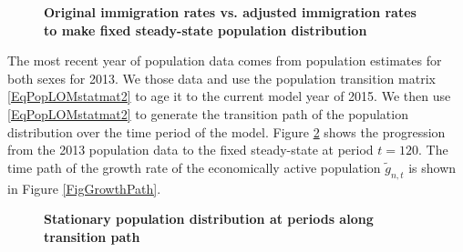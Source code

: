 \documentclass[letterpaper,12pt]{article}
\theoremstyle{definition}
\begin{document}
    \begin{figure}[htbp]\centering \captionsetup{width=4.0in}
      \caption{\label{FigImmRateChg}\textbf{Original immigration rates vs. adjusted immigration rates to make fixed steady-state population distribution}}
    \end{figure}

    The most recent year of population data comes from \citet{Census:2015} population estimates for both sexes for 2013. We those data and use the population transition matrix \eqref{EqPopLOMstatmat2} to age it to the current model year of 2015. We then use \eqref{EqPopLOMstatmat2} to generate the transition path of the population distribution over the time period of the model. Figure \ref{FigPopDistPath} shows the progression from the 2013 population data to the fixed steady-state at period $t=120$. The time path of the growth rate of the economically active population $\tilde{g}_{n,t}$ is shown in Figure \ref{FigGrowthPath}.

    \begin{figure}[htbp]\centering \captionsetup{width=4.0in}
      \caption{\label{FigPopDistPath}\textbf{Stationary population distribution at periods along transition path}}
    \end{figure}
\end{document}
